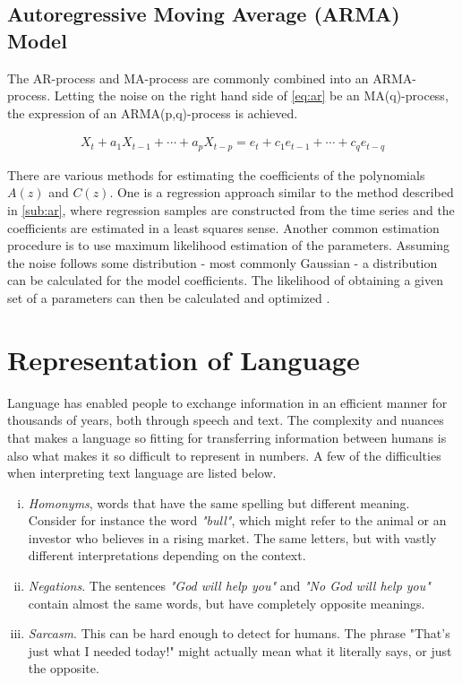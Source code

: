 \subsection{Autoregressive Moving Average (ARMA) Model}


The AR-process and MA-process are commonly combined into an ARMA-process. Letting the noise on the right hand side of \ref{eq:ar} be an MA(q)-process, the expression of an ARMA(p,q)-process is achieved. 

\begin{align}
    X_t + a_1 X_{t-1} + \cdots + a_pX_{t-p} = e_t + c_1 e_{t-1} + \cdots + c_q e_{t-q}
    \label{eq:arma}
\end{align}

There are various methods for estimating the coefficients of the polynomials $A(z)$ and $C(z)$. One is a regression approach similar to the method described in \ref{sub:ar}, where regression samples are constructed from the time series and the coefficients are estimated in a least squares sense. Another common estimation procedure is to use maximum likelihood estimation of the parameters. Assuming the noise follows some distribution - most commonly Gaussian - a distribution can be calculated for the model coefficients. The likelihood of obtaining a given set of a parameters can then be calculated and optimized \citep{hamilton1994time}. 

\section{Representation of Language}

Language has enabled people to exchange information in an efficient manner for thousands of years, both through speech and text. The complexity and nuances that makes a language so fitting for transferring information between humans is also what makes it so difficult to represent in numbers. A few of the difficulties when interpreting text language are listed below. 
\begin{enumerate}[i)]
    \item \textit{Homonyms}, words that have the same spelling but different meaning. Consider for instance the word \textit{"bull"}, which might refer to the animal or an investor who believes in a rising market. The same letters, but with vastly different interpretations depending on the context. 
    \item \textit{Negations}. The sentences \textit{"God will help you"} and \textit{"No God will help you"} contain almost the same words, but have completely opposite meanings. 
    \item \textit{Sarcasm}. This can be hard enough to detect for humans. The phrase "That's just what I needed today!" might actually mean what it literally says, or just the opposite.
\end{enumerate}

